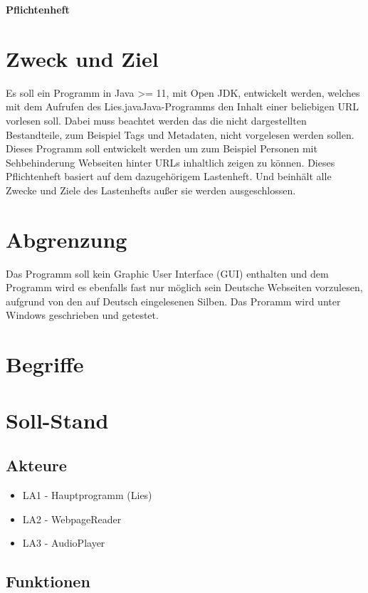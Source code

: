 \documentclass[11pt]{scrartcl}
\begin{document}
\begin{center}
\textbf{Pflichtenheft}
\end{center}

\section{Zweck und Ziel}
Es soll ein Programm in Java >= 11, mit Open JDK, entwickelt werden, welches mit dem Aufrufen des \glqq Lies.java\grqq Java-Programms den Inhalt einer beliebigen URL vorlesen soll. Dabei muss beachtet werden das die nicht dargestellten Bestandteile, zum Beispiel Tags und Metadaten, nicht vorgelesen werden sollen. Dieses Programm soll entwickelt werden um zum Beispiel Personen mit Sehbehinderung Webseiten hinter URLs inhaltlich zeigen zu können. Dieses Pflichtenheft basiert auf dem dazugehörigem Lastenheft. Und beinhält alle Zwecke und Ziele des Lastenhefts außer sie werden ausgeschlossen.

\section{Abgrenzung}
Das Programm soll kein Graphic User Interface (GUI) enthalten und dem Programm wird es ebenfalls fast nur möglich sein Deutsche Webseiten vorzulesen, aufgrund von den auf Deutsch eingelesenen Silben. Das Proramm wird unter Windows geschrieben und getestet.

\section{Begriffe}


\section{Soll-Stand}


\subsection{Akteure}

\begin{itemize}
	\item LA1 - Hauptprogramm (Lies)
	\item LA2 - WebpageReader
	\item LA3 - AudioPlayer
\end{itemize}

\subsection{Funktionen}
\end{document}
